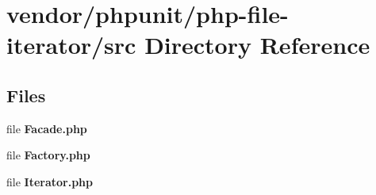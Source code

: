 \section{vendor/phpunit/php-\/file-\/iterator/src Directory Reference}
\label{dir_6e25ac54394d5c4209aac29048da463c}
\subsection*{Files}
\begin{DoxyCompactItemize}
\item 
file {\bf Facade.\+php}
\item 
file {\bf Factory.\+php}
\item 
file {\bf Iterator.\+php}
\end{DoxyCompactItemize}
